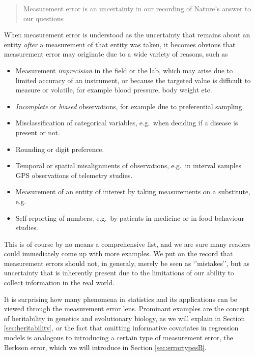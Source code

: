 \documentclass[]{book}
\providecommand{\tightlist}{%
  \setlength{\itemsep}{0pt}\setlength{\parskip}{0pt}}
\theoremstyle{definition}
\theoremstyle{definition}
\theoremstyle{definition}
\theoremstyle{remark}
\begin{document}
\begin{quote}
Measurement error is an uncertainty in our recording of Nature's answer
to our questions
\end{quote}

When measurement error is understood as the uncertainty that remains
about an entity \emph{after} a measurement of that entity was taken, it
becomes obvious that measurement error may originate due to a wide
variety of reasons, such as

\begin{itemize}
\tightlist
\item
  Measurement \emph{imprecision} in the field or the lab, which may
  arise due to limited accuracy of an instrument, or because the
  targeted value is difficult to measure or volatile, for example blood
  pressure, body weight etc.
\item
  \emph{Incomplete} or \emph{biased} observations, for example due to
  preferential sampling.
\item
  Misclassification of categorical variables, e.g.~when deciding if a
  disease is present or not.
\item
  Rounding or digit preference.
\item
  Temporal or spatial misalignments of observations, e.g.~in interval
  samples GPS observations of telemetry studies.
\item
  Measurement of an entity of interest by taking measurements on a
  substitute, e.g.
\item
  Self-reporting of numbers, e.g.~by patients in medicine or in food
  behaviour studies. 
\end{itemize}

This is of course by no means a comprehensive list, and we are sure many
readers could immediately come up with more examples. We put on the
record that measurement errors should not, in generaly, merely be seen
as `'mistakes'', but as uncertainty that is inherently present due to
the limitations of our ability to collect information in the real world.

It is surprising how many phenomena in statistics and its applications
can be viewed through the measurement error lens. Prominant examples are
the concept of heritability in genetics and evolutionary biology, as we
will explain in Section \ref{sec:heritability}, or the fact that
omitting informative covariates in regression models is analogous to
introducing a certain type of measurement error, the Berkson error,
which we will introduce in Section \ref{sec:errortypesB}.
\end{document}
